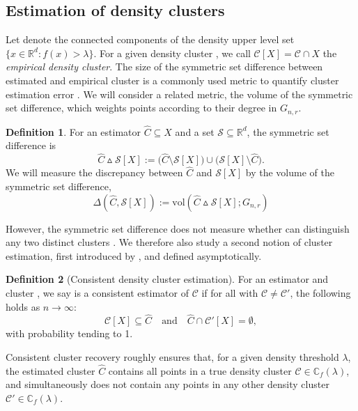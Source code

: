 \documentclass{article}
\newcommand{\Reals}{\mathbb{R}}
\newcommand{\vol}{\mathrm{vol}}
\newcommand{\1}{\mathbf{1}}
\newcommand{\Rd}{\Reals^d}
\newcommand{\Cset}{\mathcal{C}}
\newcommand{\Cbb}{\mathbb{C}}
\theoremstyle{alden}
\theoremstyle{aldenthm}
\theoremstyle{definition}
\newtheorem{definition}{Definition}[section]
\theoremstyle{remark}
\begin{document}
\subsection{Estimation of density clusters} 
Let \smash{$\Cbb_f(\lambda)$} denote 
the connected components of the density upper level set $\{x \in \Rd: f(x) >
\lambda\}$.  For a given density cluster \smash{$\Cset \in \Cbb_f(\lambda)$}, we
call $\Cset[X] = \Cset \cap X$ the \emph{empirical density cluster}. The size of the symmetric set difference between estimated and empirical cluster is 
a commonly used metric to quantify cluster estimation error
\citep{korostelev1993,polonik1995,rigollet2009}. We will consider a related metric, the volume of the symmetric set difference, which weights points according to their degree in $G_{n,r}$. 
\begin{definition}
	\label{def:volume_symmetric_set_difference}
	For an estimator $\widehat{C} \subseteq X$ and a set $\mathcal{S} \subseteq \Rd$, the symmetric set difference is 
	\begin{equation*}
	\widehat{C} \vartriangle \mathcal{S}[X] := \bigl(\widehat{C} \setminus \mathcal{S}[X]\bigr) \cup \bigl(\mathcal{S}[X]\setminus\widehat{C} \bigr).
	\end{equation*}
	We will measure the discrepancy between $\widehat{C}$ and $\mathcal{S}[X]$ by the volume of the symmetric set difference,
	\begin{equation*}
	\Delta(\widehat{C}, \mathcal{S}[X]) := \vol(\widehat{C} \vartriangle \mathcal{S}[X]; G_{n,r})
	\end{equation*}
\end{definition}
However, the symmetric set difference does not measure whether  
can distinguish any two distinct clusters \smash{$\Cset,\Cset' \in
	\Cbb_f(\lambda)$}. We therefore also study a second notion of cluster
estimation, first introduced by \citet{hartigan1981}, and defined
asymptotically. 

\begin{definition}[Consistent density cluster estimation]
	\label{def: consistent_density_cluster_estimation}
	For an estimator  and cluster 
	\smash{$\Cset \in \Cbb_f(\lambda)$}, we say  is a consistent 
	estimator of $\Cset$ if for all \smash{$\Cset' \in \Cbb_f(\lambda)$} with
	$\Cset \not= \Cset'$, the following holds as $n \to \infty$: 
	\begin{equation}
	\label{eqn: consistent_density_cluster_recovery}
	\Cset[X] \subseteq \widehat{C} \quad \text{and} \quad
	\widehat{C} \cap \Cset'[X] = \emptyset,
	\end{equation}
	with probability tending to 1.
\end{definition}
\noindent Consistent cluster recovery roughly ensures that, for a given density threshold $\lambda$, the estimated cluster $\widehat{C}$ contains all
points in a true
density cluster $\Cset \in \Cbb_f(\lambda)$, and simultaneously does not contain any points in any other density cluster $\Cset' \in \Cbb_f(\lambda)$. 
\end{document}
